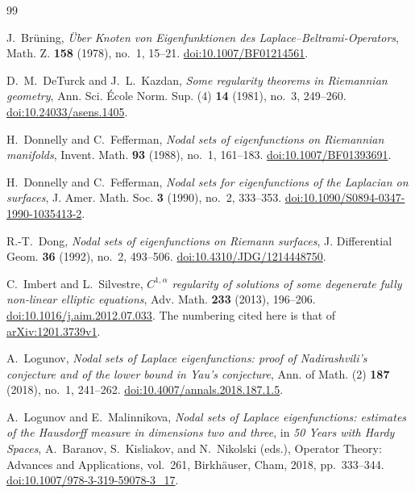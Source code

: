 \newpage
\begin{thebibliography}{99}

J.~Br\"uning,
\emph{\"Uber Knoten von Eigenfunktionen des Laplace--Beltrami-Operators},
Math. Z. \textbf{158} (1978), no.~1, 15--21.
\href{https://doi.org/10.1007/BF01214561}{doi:10.1007/BF01214561}.

D.~M.~DeTurck and J.~L.~Kazdan,
\emph{Some regularity theorems in Riemannian geometry},
Ann. Sci. \'Ecole Norm. Sup. (4) \textbf{14} (1981), no.~3, 249--260.
\href{https://doi.org/10.24033/asens.1405}{doi:10.24033/asens.1405}.

H.~Donnelly and C.~Fefferman,
\emph{Nodal sets of eigenfunctions on Riemannian manifolds},
Invent. Math. \textbf{93} (1988), no.~1, 161--183.
\href{https://doi.org/10.1007/BF01393691}{doi:10.1007/BF01393691}.

H.~Donnelly and C.~Fefferman,
\emph{Nodal sets for eigenfunctions of the Laplacian on surfaces},
J. Amer. Math. Soc. \textbf{3} (1990), no.~2, 333--353.
\href{https://doi.org/10.1090/S0894-0347-1990-1035413-2}{doi:10.1090/S0894-0347-1990-1035413-2}.

R.-T.~Dong,
\emph{Nodal sets of eigenfunctions on Riemann surfaces},
J. Differential Geom. \textbf{36} (1992), no.~2, 493--506.
\href{https://doi.org/10.4310/JDG/1214448750}{doi:10.4310/JDG/1214448750}.

C.~Imbert and L.~Silvestre,
\emph{$C^{1,\alpha}$ regularity of solutions of some degenerate fully
non-linear elliptic equations},
Adv. Math. \textbf{233} (2013), 196--206.
\href{https://doi.org/10.1016/j.aim.2012.07.033}{doi:10.1016/j.aim.2012.07.033}.
The numbering cited here is that of
\href{https://arxiv.org/abs/1201.3739v1}{arXiv:1201.3739v1}.

A.~Logunov,
\emph{Nodal sets of Laplace eigenfunctions: proof of Nadirashvili's
conjecture and of the lower bound in Yau's conjecture},
Ann. of Math. (2) \textbf{187} (2018), no.~1, 241--262.
\href{https://doi.org/10.4007/annals.2018.187.1.5}{doi:10.4007/annals.2018.187.1.5}.

A.~Logunov and E.~Malinnikova,
\emph{Nodal sets of Laplace eigenfunctions: estimates of the Hausdorff
measure in dimensions two and three},
in \emph{50 Years with Hardy Spaces},
A.~Baranov, S.~Kisliakov, and N.~Nikolski (eds.),
Operator Theory: Advances and Applications, vol.~261,
Birkh\"auser, Cham, 2018, pp.~333--344.
\href{https://doi.org/10.1007/978-3-319-59078-3_17}{doi:10.1007/978-3-319-59078-3\_17}.


\end{thebibliography}
